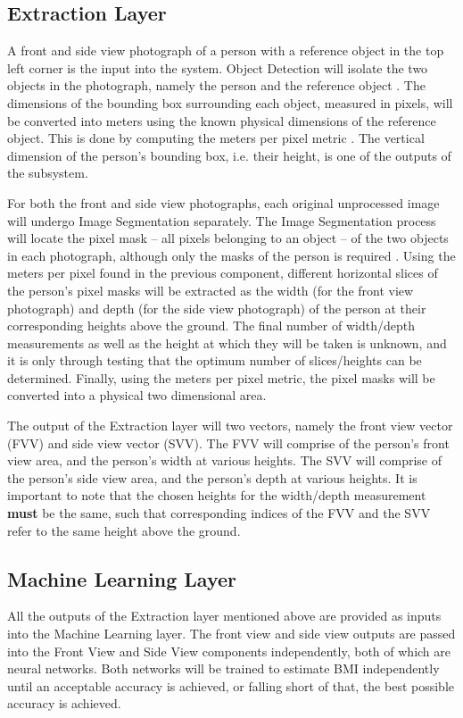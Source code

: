 \subsection{Extraction Layer}
A front and side view photograph of a person with a reference object in the top left corner is the input into the system.
Object Detection will isolate the two objects in the photograph, namely the person and the reference object \cite{objectDetection}.
The dimensions of the bounding box surrounding each object, measured in pixels, will be converted into meters using the known physical dimensions of the reference object.
This is done by computing the meters per pixel metric \cite{objectDetection}.
The vertical dimension of the person's bounding box, i.e. their height, is one of the outputs of the subsystem.

For both the front and side view photographs, each original unprocessed image will undergo Image Segmentation separately.
The Image Segmentation process will locate the pixel mask -- all pixels belonging to an object -- of the two objects in each photograph, although only the masks of the person is required \cite{semantic,instance}.
Using the meters per pixel found in the previous component, different horizontal slices of the person's pixel masks will be extracted as the width (for the front view photograph) and depth (for the side view photograph) of the person at their corresponding heights above the ground.
The final number of width/depth measurements as well as the height at which they will be taken is unknown, and it is only through testing that the optimum number of slices/heights can be determined.
Finally, using the meters per pixel metric, the pixel masks will be converted into a physical two dimensional area.

The output of the Extraction layer will two vectors, namely the front view vector (FVV) and side view vector (SVV).
The FVV will comprise of the person's front view area, and the person's width at various heights.
The SVV will comprise of the person's side view area, and the person's depth at various heights.
It is important to note that the chosen heights for the width/depth measurement \textbf{must} be the same, such that corresponding indices of the FVV and the SVV refer to the same height above the ground.
\subsection{Machine Learning Layer}
All the outputs of the Extraction layer mentioned above are provided as inputs into the Machine Learning layer.
The front view and side view outputs are passed into the Front View and Side View components independently, both of which are neural networks.
Both networks will be trained to estimate BMI independently until an acceptable accuracy is achieved, or falling short of that, the best possible accuracy is achieved.

